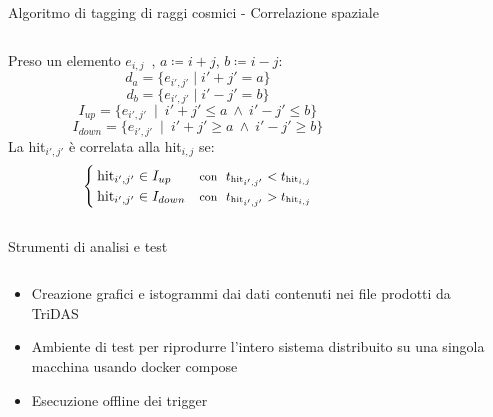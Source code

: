 \documentclass[aspectratio=169]{beamer}
\begin{document}
  \begin{frame}{Algoritmo di tagging di raggi cosmici - Correlazione spaziale}
      \begin{columns}[onlytextwidth,T]
      \begin{column}{.60\linewidth}
          Preso un elemento $e_{i,j}$\ , $a \coloneqq i + j$, $b \coloneqq i - j:$
\[
	d_a = \{ e_{i',j'} \mid i' + j' = a\}
\]
\[
	d_b = \{ e_{i',j'} \mid i' - j' = b\}
\]
\[
	I_{up} = \{ e_{i',j'}\ \mid\ i' + j' \leq a\ \land\ i' - j' \leq b\}
\]
\[
	I_{down} = \{ e_{i',j'}\ \mid\ i' + j' \geq a\ \land\ i' - j' \geq b\}
\]
La hit$_{i',j'}$ è correlata alla hit$_{i,j}$ se:
$$
          \begin{cases}
              \text{hit}_{i',j'} \in I_{up} & \text{\small {\footnotesize con} $\ t_{\text{hit}_{i',j'}} < t_{\text{hit}_{i,j}}$}\\ 
              \text{hit}_{i',j'} \in I_{down} & \text{\small {\footnotesize con}\ $\ t_{\text{hit}_{i',j'}} > t_{\text{hit}_{i,j}}$}
          \end{cases}
$$
      \end{column}
      \begin{column}{.45\linewidth}
      \end{column}
    \end{columns}
  \end{frame}
  \begin{frame}{Strumenti di analisi e test}
      \begin{columns}[onlytextwidth,T]
      \begin{column}{.45\linewidth}
      \begin{itemize}
          \item Creazione grafici e istogrammi dai dati contenuti nei file prodotti da TriDAS 
          \item Ambiente di test per riprodurre l'intero sistema distribuito su una singola macchina usando docker compose
          \item Esecuzione offline dei trigger 
      \end{itemize}
      \end{column}
      \begin{column}{.45\linewidth}
      \end{column}
    \end{columns}
  \end{frame}
\end{document}
